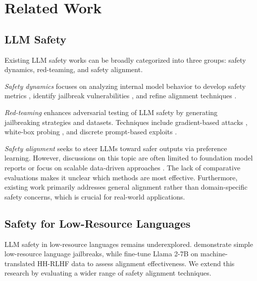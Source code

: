 \section{Related Work}
\label{sec:related_work}
\subsection{LLM Safety}
\label{sec:llm_safety}
Existing LLM safety works can be broadly categorized into three groups: safety dynamics, red-teaming, and safety alignment.

\textit{Safety dynamics} focuses on analyzing internal model behavior to develop safety metrics \citep{peng2024navigatingsafetylandscapemeasuring}, identify jailbreak vulnerabilities \citep{arditi2024refusallanguagemodelsmediated, zhou2024emulateddisalignmentsafetyalignment}, and refine alignment techniques \citep{wei2023jailbrokendoesllmsafety, zhou2024alignmentjailbreakworkexplain}.

\textit{Red-teaming} enhances adversarial testing of LLM safety by generating jailbreaking strategies and datasets. Techniques include gradient-based attacks \citep{zou2023universaltransferableadversarialattacks}, white-box probing \citep{hartvigsen2022toxigenlargescalemachinegenerateddataset, arditi2024refusallanguagemodelsmediated}, and discrete prompt-based exploits \citep{perez2022redteaminglanguagemodels, mehrotra2024treeattacksjailbreakingblackbox}.

\textit{Safety alignment} seeks to steer LLMs toward safer outputs via preference learning. However, discussions on this topic are often limited to foundation model reports \citep{openai2024gpt4technicalreport, grattafiori2024llama3herdmodels, geminiteam2024geminifamilyhighlycapable} or focus on scalable data-driven approaches \citep{bai2022constitutionalaiharmlessnessai}. The lack of comparative evaluations makes it unclear which methods are most effective. Furthermore, existing work primarily addresses general alignment rather than domain-specific safety concerns, which is crucial for real-world applications.

\subsection{Safety for Low-Resource Languages}
\label{sec:low_res_safety}
LLM safety in low-resource languages remains underexplored. \citet{yong2024lowresourcelanguagesjailbreakgpt4} demonstrate simple low-resource language jailbreaks, while \citet{shen2024languagebarrierdissectingsafety} fine-tune Llama 2-7B on machine-translated HH-RLHF data to assess alignment effectiveness. We extend this research by evaluating a wider range of safety alignment techniques.


